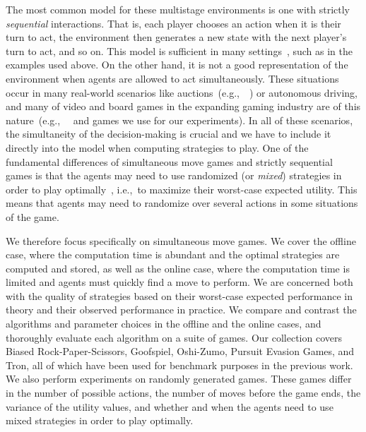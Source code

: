\documentclass[preprint,12pt]{elsarticle}
\newcommand{\eg}{{e.g.,}~}
\newcommand{\ie}{{i.e.,}~}
\newcommand{\reviewchange}[1]{{\color{black}#1}}
\begin{document}
The most common model for these multistage environments is one with strictly {\it sequential}
interactions. That is, each player chooses an action when it is their turn to act, the environment then
generates a new state with the next player's turn to act, and so on. This model is sufficient in many
settings~\cite{AIbook}, such as in the examples used above.
\reviewchange{On the other hand, it is not a good representation of the environment when agents are allowed to act simultaneously.
These situations occur in many real-world scenarios like auctions~(\eg~\cite{Keuter1997}) or autonomous driving, and many of video
and board games in the expanding gaming industry are of this nature~(\eg~\cite{Beard12Using,Teytaud11Upper} and games we use for our experiments).
In all of these scenarios, the simultaneity of the decision-making is crucial and we have to include it directly into the model when computing strategies to play.}
One of the fundamental differences of simultaneous move games and strictly sequential
games is that the agents may need to use randomized (or \textit{mixed}) strategies in order to
play optimally~\cite{Gintis09},
\ie to maximize their worst-case expected utility.
This means that agents may need to randomize over several actions in some situations of the game.

\reviewchange{We therefore focus specifically on simultaneous move games.} 
We cover the offline case, where the computation time is abundant and the optimal strategies are computed and stored, 
as well as the online case, where the computation time is limited and agents must quickly find a move to perform.
We are concerned both with the quality of strategies based on
their worst-case expected performance in theory and their observed performance in practice. 
We compare and contrast the algorithms and parameter choices in the offline and the online cases, and thoroughly evaluate each
algorithm on a suite of games. Our collection covers Biased Rock-Paper-Scissors, Goofspiel, Oshi-Zumo,
Pursuit Evasion Games, and Tron, all of which have been used for benchmark purposes
in the previous work. We also perform experiments on randomly generated games. These games differ
in the number of possible actions, the number of moves before the game ends, the variance of the utility values,
and whether and when the agents need to use mixed strategies in order to play optimally.
\end{document}
